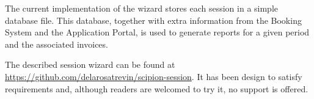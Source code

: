 The current implementation of the wizard stores each session in a simple database file. This database, together with extra information from the Booking System and the Application Portal, is used to generate reports for a given period and the associated invoices. %

The described session wizard can be found at  \url{https://github.com/delarosatrevin/scipion-session}. It has been design to satisfy \scilifelab requirements and, although readers are welcomed to try it, no support is offered.




